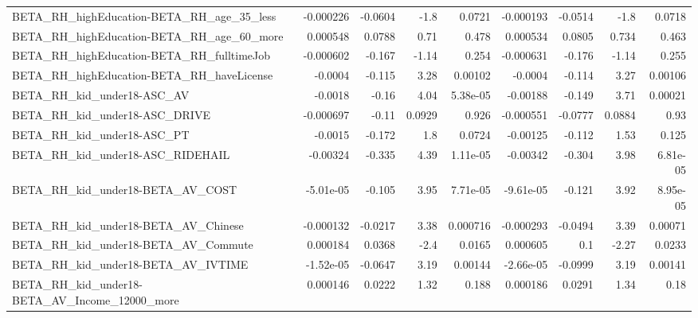 \begin{tabular}{lrrrrrrrr}
BETA\_RH\_highEducation-BETA\_RH\_age\_35\_less          &   -0.000226 &      -0.0604 &      -1.8 &   0.0721 &  -0.000193 &     -0.0514 &         -1.8 &        0.0718 \\
BETA\_RH\_highEducation-BETA\_RH\_age\_60\_more          &    0.000548 &       0.0788 &      0.71 &    0.478 &   0.000534 &      0.0805 &        0.734 &         0.463 \\
BETA\_RH\_highEducation-BETA\_RH\_fulltimeJob          &   -0.000602 &       -0.167 &     -1.14 &    0.254 &  -0.000631 &      -0.176 &        -1.14 &         0.255 \\
BETA\_RH\_highEducation-BETA\_RH\_haveLicense          &     -0.0004 &       -0.115 &      3.28 &  0.00102 &    -0.0004 &      -0.114 &         3.27 &       0.00106 \\
BETA\_RH\_kid\_under18-ASC\_AV                         &     -0.0018 &        -0.16 &      4.04 & 5.38e-05 &   -0.00188 &      -0.149 &         3.71 &       0.00021 \\
BETA\_RH\_kid\_under18-ASC\_DRIVE                      &   -0.000697 &        -0.11 &    0.0929 &    0.926 &  -0.000551 &     -0.0777 &       0.0884 &          0.93 \\
BETA\_RH\_kid\_under18-ASC\_PT                         &     -0.0015 &       -0.172 &       1.8 &   0.0724 &   -0.00125 &      -0.112 &         1.53 &         0.125 \\
BETA\_RH\_kid\_under18-ASC\_RIDEHAIL                   &    -0.00324 &       -0.335 &      4.39 & 1.11e-05 &   -0.00342 &      -0.304 &         3.98 &      6.81e-05 \\
BETA\_RH\_kid\_under18-BETA\_AV\_COST                   &   -5.01e-05 &       -0.105 &      3.95 & 7.71e-05 &  -9.61e-05 &      -0.121 &         3.92 &      8.95e-05 \\
BETA\_RH\_kid\_under18-BETA\_AV\_Chinese                &   -0.000132 &      -0.0217 &      3.38 & 0.000716 &  -0.000293 &     -0.0494 &         3.39 &       0.00071 \\
BETA\_RH\_kid\_under18-BETA\_AV\_Commute                &    0.000184 &       0.0368 &      -2.4 &   0.0165 &   0.000605 &         0.1 &        -2.27 &        0.0233 \\
BETA\_RH\_kid\_under18-BETA\_AV\_IVTIME                 &   -1.52e-05 &      -0.0647 &      3.19 &  0.00144 &  -2.66e-05 &     -0.0999 &         3.19 &       0.00141 \\
BETA\_RH\_kid\_under18-BETA\_AV\_Income\_12000\_more      &    0.000146 &       0.0222 &      1.32 &    0.188 &   0.000186 &      0.0291 &         1.34 &          0.18 \\

\end{tabular}
